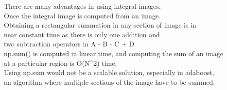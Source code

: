 There are many advantages in using integral images.\\
Once the integral image is computed from an image.\\
Obtaining a rectangular summation in any section of  image is in\\
near constant time as there is only one addition and\\
two subtraction operators in A - B - C + D\\
np.sum() is computed in linear time, and computing the sum of an image\\
at a particular region is O(N^2) time.\\
Using np.sum would not be a scalable solution, especially in adaboost,\\
an algorithm where  multiple sections of the image have to be summed.\\
